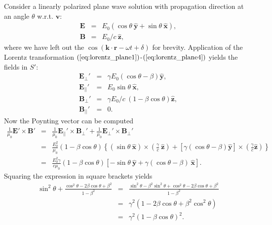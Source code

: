 \documentclass [12pt, a4paper] {article}
\newcommand{\vu}[1]
{
	\mathbf{\hat #1}
}
\newcommand{\vc}[1]
{
	\boldsymbol{#1}
}
\begin{document}
Consider a linearly polarized plane wave solution with propagation direction 
at an angle $\theta$ w.r.t. $\vc v$:
\begin {eqnarray}
    \vc E &=& E_0 \left(
        \cos\theta\:\vu y + \sin\theta\:\vu x
    \right),
    \\
    \vc B &=& E_0/c\:\vu z,
\end {eqnarray}
where we have left out the $\cos(\vc k\cdot\vc r - \omega t + \delta)$ for brevity.
Application of the Lorentz transformation 
$(\ref{eq:lorentz_plane1})$-$(\ref{eq:lorentz_plane4})$ yields the fields in $S'$:
\begin {eqnarray}
    \vc E_{\perp}'
    &=&
    \gamma E_0\left(
        \cos\theta - \beta
    \right)\vu y,
    \\
    \vc E_{||}' 
    &=&  
    E_0\sin\theta\:\vu x,
    \\
    \vc B_{\perp}'
    &=&
    \gamma E_0/c\:\left(
        1 - \beta\cos\theta
    \right)\vu z,
    \\
    \vc B_{||}'
    &=&
    0.
\end {eqnarray}
Now the Poynting vector can be computed 
\begin {eqnarray}
    \frac{1}{\mu_0}\vc E'\times\vc B'
    &=&
    \frac{1}{\mu_0}
    \vc E_{||}'\times\vc B_{\perp}' + \frac{1}{\mu_0}\vc E_{\perp}'\times\vc B_{\perp}'
    \\
    &=&
    \frac{E_0^2}{\mu_0}
    (1 - \beta\cos\theta)
    \left\{
    \left(\sin\theta\:\vu x\right)
    \times 
    \left(
        \frac{\gamma}{c}\:\vu z
    \right)
    +
    \left[
        \gamma(\cos\theta - \beta)\vu y
    \right]
    \times 
    \left(
        \frac{\gamma}{c}\vu z
    \right)
    \right\}
    \\
    &=&
    \frac{E_0^2\gamma}{c\mu_0}
    (1 - \beta\cos\theta)
    \left[
        -\sin\theta\:\vu y 
        + 
        \gamma(\cos\theta - \beta)\:\vu x
    \right].
    \label{eq:poynting_plane}
\end {eqnarray}
Squaring the expression in square brackets yields 
\begin {eqnarray}
    \sin^2\theta + \frac{\cos^2\theta - 2\beta\cos\theta + \beta^2}{1 - \beta^2}
    &=&
    \frac{\sin^2\theta - \beta^2\sin^2\theta + \cos^2\theta - 2\beta\cos\theta + \beta^2}{1 - \beta^2}
    \\
    &=& 
    \gamma^2(
        1 - 2\beta\cos\theta + \beta^2\cos^2\theta
    )
    \\
    &=& 
    \gamma^2(1 - \beta\cos\theta)^2.
\end {eqnarray}
\end{document}
